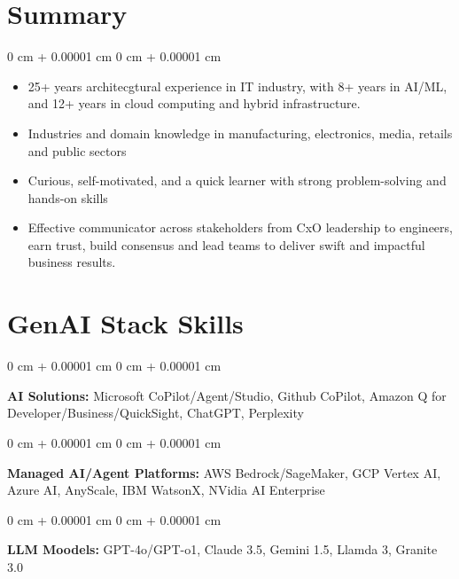 \documentclass[10pt, letterpaper]{article}
\newenvironment{highlightsforbulletentries}{
    \begin{itemize}[
        topsep=0.10 cm,
        parsep=0.10 cm,
        partopsep=0pt,
        itemsep=0pt,
        leftmargin=10pt
    ]
}{
    \end{itemize}
} %
\newenvironment{onecolentry}{
    \begin{adjustwidth}{
        0 cm + 0.00001 cm
    }{
        0 cm + 0.00001 cm
    }
}{
    \end{adjustwidth}
} %
\begin{document}
    
    \section{Summary}

    \begin{onecolentry}
        \begin{highlightsforbulletentries}


        \item 25+ years architecgtural experience in IT industry, with 8+ years in AI/ML, and 12+ years in cloud computing and hybrid infrastructure.
        
        \item Industries and domain knowledge in manufacturing, electronics, media, retails and public sectors
        
        \item  Curious, self-motivated, and a quick learner with strong problem-solving and hands-on skills

        \item  Effective communicator across stakeholders from CxO leadership to engineers, earn trust, build consensus and lead teams to deliver swift and impactful business results.
        
        \end{highlightsforbulletentries}
    \end{onecolentry}




    \section{GenAI Stack Skills}
        
        \begin{onecolentry}
            \textbf{AI Solutions:} Microsoft CoPilot/Agent/Studio, Github CoPilot, Amazon Q for Developer/Business/QuickSight, ChatGPT, Perplexity
        \end{onecolentry}

        \begin{onecolentry}
            \textbf{Managed AI/Agent Platforms:} AWS Bedrock/SageMaker, GCP Vertex AI, Azure AI, AnyScale, IBM WatsonX, NVidia AI Enterprise
        \end{onecolentry}

        \begin{onecolentry}
            \textbf{LLM Moodels:} GPT-4o/GPT-o1, Claude 3.5, Gemini 1.5, Llamda 3, Granite 3.0
        \end{onecolentry}
\end{document}
